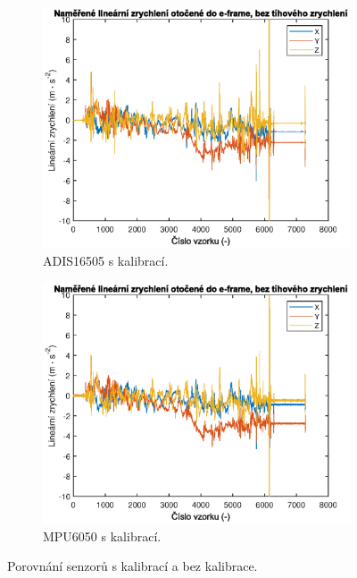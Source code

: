 \begin{figure}[h]
     
     \centering
     \begin{subfigure}[b]{0.49\textwidth}
         \centering
         \includegraphics[width=\textwidth]{obrazky/matlab/1adisWithCal}
         \caption{ADIS16505 s kalibrací.}   
         \label{fig:AdisWithCal}  
     \end{subfigure}
     \hfill
     \centering
     \begin{subfigure}[b]{0.49\textwidth}
         \centering
         \includegraphics[width=\textwidth]{obrazky/matlab/1mpuWithCal}
         \caption{MPU6050 s kalibrací.}   
         \label{fig:mpuWithCal}  
     \end{subfigure}
        \caption{Porovnání senzorů s kalibrací a bez kalibrace.}
        \label{fig:calibrationComp}
\end{figure}

